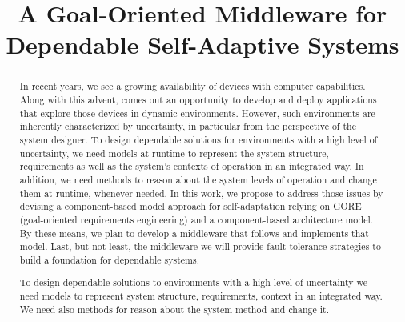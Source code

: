 \documentclass[mestrado]{pacotes/unb-cic}
\title{A Goal-Oriented Middleware for Dependable Self-Adaptive Systems}
\begin{document}
\maketitle

\pretextual



\begin{abstract}\textbf{}

In recent years, we see a growing availability of devices with computer capabilities. Along with this advent, comes out an opportunity to develop and deploy applications that explore those devices in dynamic environments. However, such environments are inherently characterized by uncertainty, in particular from the perspective of the system designer. To design dependable solutions for environments with a high level of uncertainty, we need models at runtime to represent the system structure, requirements as well as the system's contexts of operation in an integrated way. In addition, we need methods to reason about the system levels of operation and change them at runtime, whenever needed. In this work, we propose to address those issues by devising a component-based model approach for self-adaptation relying on GORE (goal-oriented requirements engineering) and a component-based architecture model. By these means, we plan to develop a middleware that follows and implements that model. Last, but not least, the middleware we will provide fault tolerance strategies to build a foundation for dependable systems.

  To design dependable solutions to environments with a high level of uncertainty we need models to represent system structure, requirements, context in an integrated way. We need also methods for reason about the system method and change it.



\end{abstract}
\end{document}
